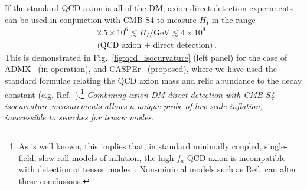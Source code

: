 If the standard QCD axion is all of the DM, axion direct detection experiments can be used in conjunction with CMB-S4 to measure $H_I$ in the range
\begin{align}
& 2.5\times 10^6\lesssim H_I/\text{GeV}\lesssim 4\times 10^9\,  \nonumber \\ 
&\text{(QCD axion + direct detection)}\,.
\end{align}
This is demonstrated in Fig.~\ref{fig:qcd_isocurvature} (left panel) for the case of ADMX~\cite{Asztalos:2009yp} (in operation), and CASPEr~\cite{Budker:2013hf} (proposed), where we have used the standard formulae relating the QCD axion mass and relic abundance to the decay constant (e.g. Ref.~\cite{Fox:2004kb}).\footnote{As is well known, this implies that, in standard minimally coupled, single-field, slow-roll models of inflation, the high-$f_a$ QCD axion is incompatible with detection of tensor modes~\cite{Fox:2004kb,Hertzberg:2008wr,Visinelli:2014twa,Marsh:2014qoa}. Non-minimal models such as Ref.~\cite{Fairbairn:2014zta}can alter these conclusions.} \emph{Combining axion DM direct detection with CMB-S4 isocurvature measurements allows a unique probe of low-scale inflation, inaccessible to searches for tensor modes.}

